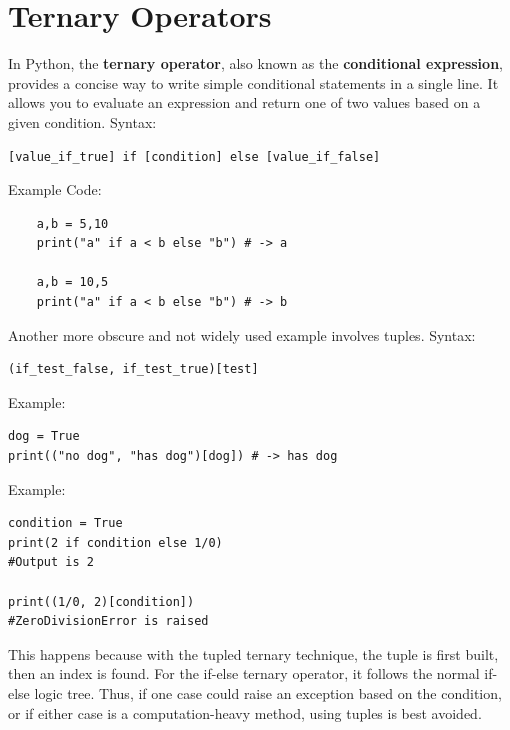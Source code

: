 \documentclass{report}
\begin{document}
    \pagebreak \bigbreak \noindent \section{Ternary Operators}
    \bigbreak \noindent
    In Python, the \textbf{ternary operator}, also known as the \textbf{conditional expression}, provides a concise way to write simple conditional statements in a single line. It allows you to evaluate an expression and return one of two values based on a given condition.
    \bigbreak \noindent 
    Syntax:
    \begin{verbatim}
[value_if_true] if [condition] else [value_if_false]
    \end{verbatim}
    Example Code:
    \begin{verbatim}
    a,b = 5,10
    print("a" if a < b else "b") # -> a

    a,b = 10,5
    print("a" if a < b else "b") # -> b
    \end{verbatim}
    Another more obscure and not widely used example involves tuples.
    \bigbreak \noindent 
    Syntax:
    \begin{verbatim}
(if_test_false, if_test_true)[test]
    \end{verbatim}
    Example:
    \begin{verbatim}
dog = True
print(("no dog", "has dog")[dog]) # -> has dog
    \end{verbatim}
    \bigbreak \noindent 
    \bigbreak \noindent 
    Example:
    \begin{verbatim}
condition = True
print(2 if condition else 1/0)
#Output is 2

print((1/0, 2)[condition])
#ZeroDivisionError is raised
    \end{verbatim}
    This happens because with the tupled ternary technique, the tuple is first built, then an index is found. For the if-else ternary operator, it follows the normal if-else logic tree. Thus, if one case could raise an exception based on the condition, or if either case is a computation-heavy method, using tuples is best avoided.
\end{document}
